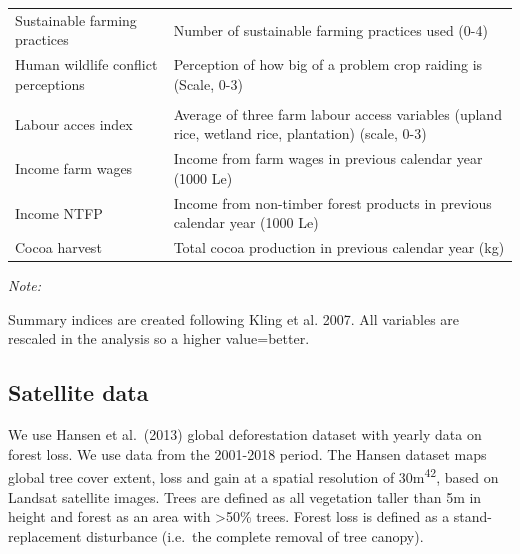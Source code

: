 \documentclass[
]{article}
\begin{document}
\begin{table}[!h]
\begin{threeparttable}
\begin{tabular}[t]{l>{\raggedright\arraybackslash}p{30em}}
\hspace{1em}Sustainable farming practices & Number of sustainable farming practices used (0-4)\\
\hspace{1em}Human wildlife conflict perceptions & Perception of how big of a problem crop raiding is  (Scale, 0-3)\\
\addlinespace[0.3em]
\multicolumn{2}{l}{\textbf{Mechanisms}}\\
\hspace{1em}Labour acces index & Average of three farm labour access variables (upland rice, wetland rice, plantation) (scale, 0-3)\\
\hspace{1em}Income farm wages & Income from farm wages in previous calendar year (1000 Le)\\
\hspace{1em}Income NTFP & Income from non-timber forest products in previous calendar year (1000 Le)\\
\hspace{1em}Cocoa harvest & Total cocoa production in previous calendar year (kg)\\
\bottomrule
\end{tabular}
\begin{tablenotes}
\item \textit{Note: } 
\item Summary indices are created following Kling et al. 2007. All variables are rescaled in the analysis so a higher value=better.
\end{tablenotes}
\end{threeparttable}
\end{table}

\hypertarget{satellite-data}{%
\subsection*{Satellite data}\label{satellite-data}}

We use Hansen et al.~(2013) global deforestation dataset with yearly
data on forest loss. We use data from the 2001-2018 period. The Hansen
dataset maps global tree cover extent, loss and gain at a spatial
resolution of 30m\textsuperscript{42}, based on Landsat satellite
images. Trees are defined as all vegetation taller than 5m in height and
forest as an area with \textgreater50\% trees. Forest loss is defined as
a stand-replacement disturbance (i.e.~the complete removal of tree
canopy).
\end{document}
